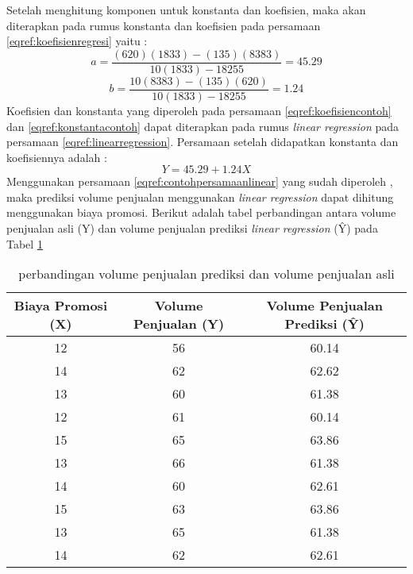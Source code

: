 Setelah menghitung komponen untuk konstanta dan koefisien, maka akan diterapkan pada rumus konstanta dan koefisien pada persamaan \ref{eqref:koefisienregresi} yaitu : 
\begin{equation}
 a = \frac{(620)(1833) - (135)(8383)}{10(1833) -18255 }  = 45.29
 \label{eqref:konstantacontoh}
\end{equation}
\begin{equation}
 b = \frac{10(8383) - (135)(620)}{10(1833) -18255 } = 1.24 
 \label{eqref:koefisiencontoh}
\end{equation}
Koefisien dan konstanta yang diperoleh pada persamaan \ref{eqref:koefisiencontoh} dan \ref{eqref:konstantacontoh}  dapat diterapkan pada rumus \textit{linear regression} pada persamaan \ref{eqref:linearregression}. Persamaan setelah didapatkan konstanta dan koefisiennya adalah : 
\begin{equation}
  Y = 45.29 + 1.24X
  \label{eqref:contohpersamaanlinear}
\end{equation}
Menggunakan persamaan \ref{eqref:contohpersamaanlinear} yang sudah diperoleh , maka prediksi volume penjualan menggunakan \textit{linear regression} dapat dihitung menggunakan biaya promosi. Berikut adalah tabel perbandingan antara volume penjualan asli (Y) dan volume penjualan prediksi \textit{linear regression} (\^{Y}) pada Tabel \ref{tab:perbandinganlinearregression}

\pagebreak

\begin{table}[ht]
\centering
\begin{tabular}{|c|c|c|}
\hline 
Biaya Promosi (X) & Volume Penjualan (Y) & Volume Penjualan Prediksi (\^{Y}) \\ 
\hline 
12 & 56 & 60.14 \\ 
\hline 
14 & 62 & 62.62 \\ 
\hline 
13 & 60 & 61.38 \\ 
\hline 
12 & 61 & 60.14 \\ 
\hline 
15 & 65 & 63.86 \\ 
\hline 
13 & 66 & 61.38 \\ 
\hline 
14 & 60 & 62.61 \\ 
\hline 
15 & 63 & 63.86 \\ 
\hline 
13 & 65 & 61.38 \\ 
\hline 
14 & 62 & 62.61 \\ 
\hline 
\end{tabular} 
\caption{perbandingan volume penjualan prediksi dan volume penjualan asli}
\label{tab:perbandinganlinearregression}
\end{table}


